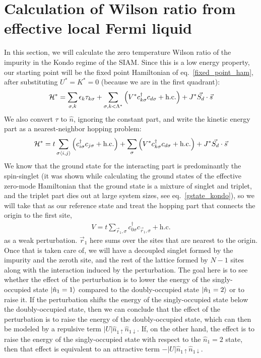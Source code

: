 \documentclass[12pt,twoside]{report}
\numberwithin{equation}{section}
\begin{document}
\section{Calculation of Wilson ratio from effective local Fermi liquid}
In this section, we will calculate the zero temperature Wilson ratio of the impurity in the Kondo regime of the SIAM. Since this is a low energy property, our starting point will be the fixed point Hamiltonian of eq.~\ref{fixed_point_ham}, after substituting \(U^*=K^*=0\) (because we are in the first quadrant):
\begin{equation}\begin{aligned}
	\mathcal{H}^* = \sum_{\sigma, k}\epsilon_k \tau_{k\sigma} + \sum_{\sigma, k < \Lambda^*}\left( V^* c^\dagger_{k\sigma}c_{d\sigma} + \text{h.c.} \right) + J^* \vec{S_d}\cdot\vec{s}
\end{aligned}\end{equation}
We also convert \(\tau\) to \(\hat n\), ignoring the constant part, and write the kinetic energy part as a nearest-neighbor hopping problem:
\begin{equation}\begin{aligned}
	\mathcal{H}^* = t\sum_{\sigma\left<i,j \right>}\left(c^\dagger_{i\sigma}c_{j\sigma} + \text{h.c.}\right) + \sum_{\sigma}\left( V^* c^\dagger_{k\sigma}c_{d\sigma} + \text{h.c.} \right) + J^* \vec{S_d}\cdot\vec{s}
\end{aligned}\end{equation}
We know that the ground state for the interacting part is predominantly the spin-singlet (it was shown while calculating the ground states of the effective zero-mode Hamiltonian that the ground state is a mixture of singlet and triplet, and the triplet part dies out at large system sizes, see eq.~\ref{gstate_kondo}), so we will take that as our reference state and treat the hopping part that connects the origin to the first site,
\begin{equation}\begin{aligned}
	V = t\sum_{\vec r_1,\sigma} c^\dagger_{0\sigma}c_{\vec r_1,\sigma} +\text{h.c.}
\end{aligned}\end{equation}
as a weak perturbation. \(\vec r_1\) here sums over the sites that are nearest to the origin. Once that is taken care of, we will have a decoupled singlet formed by the impurity and the zeroth site, and the rest of the lattice formed by \(N-1\) sites along with the interaction induced by the perturbation. The goal here is to see whether the effect of the perturbation is to lower the energy of the singly-occupied state \(\ket{\hat n_1 = 1}\) compared to the doubly-occupied state \(\ket{\hat n_1 = 2}\) or to raise it. If the perturbation shifts the energy of the singly-occupied state below the doubly-occupied state, then we can conclude that the effect of the perturbation is to raise the energy of the doubly-occupied state, which can then be modeled  by a repulsive term \(|U|\hat n_{1\uparrow}\hat n_{1\downarrow}\). If, on the other hand, the effect is to raise the energy of the singly-occupied state with respect to the \(\hat n_1 = 2\) state, then that effect is equivalent to an attractive term \(-|U|\hat n_{1\uparrow}\hat n_{1\downarrow}\).
\end{document}
